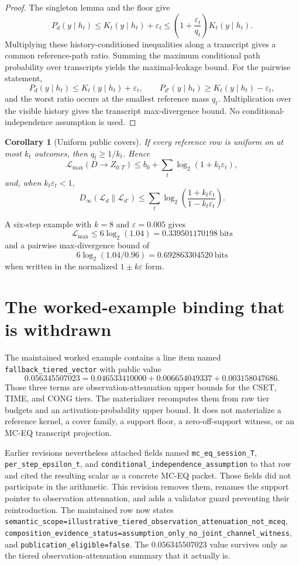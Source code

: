 \documentclass[11pt]{article}
\newtheorem{corollary}{Corollary}
\newcommand{\Dinf}{D_{\infty}}
\newcommand{\ML}{\mathcal{L}_{\max}}
\begin{document}
\begin{proof}
The singleton lemma and the floor give
\[
P_d(y\mid h_t)\le K_t(y\mid h_t)+\varepsilon_t
\le \left(1+\frac{\varepsilon_t}{q_t}\right)K_t(y\mid h_t).
\]
Multiplying these history-conditioned inequalities along a transcript gives a common reference-path ratio.  Summing the maximum conditional path probability over transcripts yields the maximal-leakage bound.  For the pairwise statement,
\[
P_d(y\mid h_t)\le K_t(y\mid h_t)+\varepsilon_t,
\qquad
P_{d'}(y\mid h_t)\ge K_t(y\mid h_t)-\varepsilon_t,
\]
and the worst ratio occurs at the smallest reference mass $q_t$.  Multiplication over the visible history gives the transcript max-divergence bound.  No conditional-independence assumption is used.
\end{proof}

\begin{corollary}[Uniform public covers]
If every reference row is uniform on at most $k_t$ outcomes, then $q_t\ge1/k_t$.  Hence
\[
\ML(D\!\to\! Z_{0:T})
\le b_0+\sum_t\log_2(1+k_t\varepsilon_t),
\]
and, when $k_t\varepsilon_t<1$,
\[
\Dinf(\mathcal L_d\|\mathcal L_{d'})
\le\sum_t\log_2\!\left(\frac{1+k_t\varepsilon_t}{1-k_t\varepsilon_t}\right).
\]
\end{corollary}

A six-step example with $k=8$ and $\varepsilon=0.005$ gives
\[
\ML\le 6\log_2(1.04)=0.339501170198\ \text{bits}
\]
and a pairwise max-divergence bound of
\[
6\log_2(1.04/0.96)=0.692863304520\ \text{bits}
\]
when written in the normalized $1\pm k\varepsilon$ form.

\section{The worked-example binding that is withdrawn}
The maintained worked example contains a line item named
\texttt{fallback\_tiered\_vector} with public value
\[
0.056345507023
=0.046533410000+0.006654049337+0.003158047686.
\]
Those three terms are observation-attenuation upper bounds for the CSET, TIME, and CONG tiers.  The materializer recomputes them from raw tier budgets and an activation-probability upper bound.  It does not materialize a reference kernel, a cover family, a support floor, a zero-off-support witness, or an MC-EQ transcript projection.

Earlier revisions nevertheless attached fields named \texttt{mc\_eq\_session\_T}, \texttt{per\_step\_epsilon\_t}, and \texttt{conditional\_independence\_assumption} to that row and cited the resulting scalar as a concrete MC-EQ packet.  Those fields did not participate in the arithmetic.  This revision removes them, renames the support pointer to observation attenuation, and adds a validator guard preventing their reintroduction.  The maintained row now states \nolinkurl{semantic_scope=illustrative_tiered_observation_attenuation_not_mceq}, \nolinkurl{composition_evidence_status=assumption_only_no_joint_channel_witness}, and \nolinkurl{publication_eligible=false}.  The $0.056345507023$ value survives only as the tiered observation-attenuation summary that it actually is.
\end{document}
